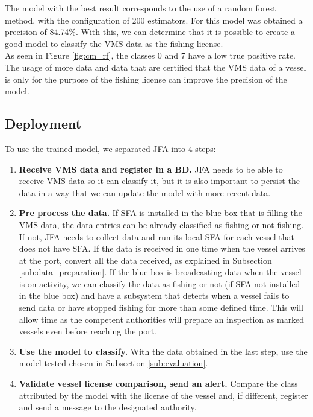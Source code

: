 \newpage


The model with the best result corresponds to the use of a random forest method, with the configuration of 200 estimators. For this model was obtained a precision of 84.74\%.
With this, we can determine that it is possible to create a good model to classify the VMS data as the fishing license. \\
As seen in Figure \ref{fig:cm_rf}, the classes 0 and 7 have a low true positive rate. The usage of more data and data that are certified that the VMS data of a vessel is only for the purpose of the fishing license can improve the precision of the model.





\subsection{Deployment} %
\label{sub:deployment}

To use the trained model, we separated JFA into 4 steps:
\begin{enumerate}
\item \textbf{ Receive VMS data and register in a BD.} JFA needs to be able to receive VMS data so it can classify it, but it is also important to persist the data in a way that we can update the model with more recent data. 

\item \textbf{Pre process the data.} If SFA is installed in the blue box that is filling the VMS data, the data entries can be already classified as fishing or not fishing. If not, JFA needs to collect data and run its local SFA for each vessel that does not have SFA. If the data is received in one time when the vessel arrives at the port, convert all the data received, as explained in Subsection \ref{sub:data_preparation}. If the blue box is broadcasting data when the vessel is on activity, we can classify the data as fishing or not (if SFA not installed in the blue box) and have a subsystem that detects when a vessel fails to send data or have stopped fishing for more than some defined time. This will allow time as the competent authorities will prepare an inspection as marked vessels even before reaching the port.

\item \textbf{Use the model to classify.} With the data obtained in the last step, use the model tested chosen in Subsection \ref{sub:evaluation}.

\item \textbf{Validate vessel license comparison, send an alert.} Compare the class attributed by the model with the license of the vessel and, if different, register and send a message to the designated authority.

\end{enumerate}

